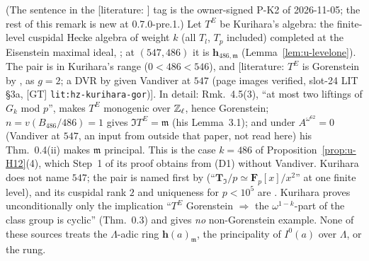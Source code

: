 \documentclass[11pt]{article}
\newcommand{\LIT}[1]{\textsf{[literature: #1]}}   %
\newcommand{\Iw}{\Lambda}                         %
\newcommand{\hcusp}{\mathbf{h}}                   %
\newcommand{\Zl}{\Z_\ell}
\begin{document}
\begin{remark}\label{rmk:u-H12lit}
(The sentence in the \LIT{} tag is the owner-signed P-K2 of 2026-11-05; the rest of this remark is new at 0.7.0-pre.1.) Let $T^{E}$ be Kurihara's algebra: the finite-level cuspidal Hecke algebra of weight $k$ (all $T_l$, $T_p$ included) completed at the
Eisenstein maximal ideal, \cite[pp.~282--283]{kurihara1993}; at $(547,486)$ it is $\hcusp_{486,\mathfrak m}$ (Lemma~\ref{lem:u-levelone}). The pair is in Kurihara's range ($0<486<546$),
and \LIT{$T^{E}$ is Gorenstein by \cite[Rmk.~4.5(3)]{kurihara1993}, as $g=2$; a DVR by \cite[Thm.~0.4]{kurihara1993} given Vandiver at $547$ (page images verified, slot-24 LIT \S3a,
[GT] \texttt{lit:hz-kurihara-gor})}. In detail: Rmk.~4.5(3), ``at most two liftings of $G_k$ mod $p$'', makes $T^{E}$ monogenic over $\Zl$, hence Gorenstein; $n=v(B_{486}/486)=1$ gives
$\mathfrak IT^{E}=\mathfrak m$ (his Lemma~3.1); and under $A^{\omega^{62}}=0$ (Vandiver at $547$, an input from outside that paper, not read here) his Thm.~0.4(ii) makes $\mathfrak m$
principal. This is the case $k=486$ of Proposition~\ref{prop:u-H12}(4), which Step~1 of its proof obtains from (D1) without Vandiver. Kurihara does not name $547$; the pair is named first by
\cite[p.~68]{calegari_eisdef} (``$\mathbf T_{\mathfrak I}/p\simeq\mathbf F_p[x]/x^{2}$'' at one finite level), and its cuspidal rank $2$ and uniqueness for $p<10^{5}$ are
\cite[\S1.1, \S3.9]{bellaiche_pollack}. Kurihara proves unconditionally only the implication ``$T^{E}$ Gorenstein $\Rightarrow$ the $\omega^{1-k}$-part of the class group is cyclic'' (Thm.~0.3) and gives
\emph{no} non-Gorenstein example. None of these sources treats the $\Iw$-adic ring $\hcusp(a)_{\mathfrak m}$, the principality of $I^{0}(a)$ over $\Iw$, or the rung.
\end{remark}
\end{document}

